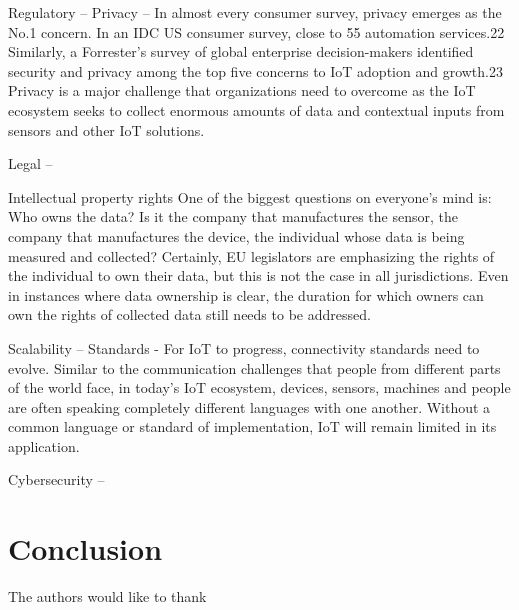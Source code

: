 \documentclass[sigconf]{acmart}
\begin{document}
Regulatory – 
Privacy – 
In almost every consumer survey, privacy emerges as the No.1 concern. In an IDC US consumer survey, close
to 55%
automation services.22 Similarly, a Forrester’s survey of global enterprise decision-makers identified security and privacy among the top five concerns to IoT adoption and growth.23 Privacy is a major challenge that organizations need to overcome as the IoT ecosystem seeks to collect enormous amounts of data and contextual inputs from sensors and other IoT solutions.

Legal – 

Intellectual property rights
One of the biggest questions on everyone’s mind is: Who owns the data? Is it the company that manufactures the sensor, the company that manufactures the device, the individual whose data is being measured and collected? Certainly, EU legislators are emphasizing the rights of the individual to own their data, but this is not the case in all jurisdictions. Even in instances where data ownership is clear, the duration for which owners can own the rights of collected data still needs to be addressed.

Scalability – 
Standards -  
For IoT to progress, connectivity standards need to evolve. Similar to the communication challenges that
people from different parts of the world face, in today’s IoT ecosystem, devices, sensors, machines and people
are often speaking completely different languages with one another. Without a common language or standard of implementation, IoT will remain limited in its application.

Cybersecurity – 


\section{Conclusion}

\begin{acks}

  The authors would like to thank 

\end{acks}


 
\end{document}
